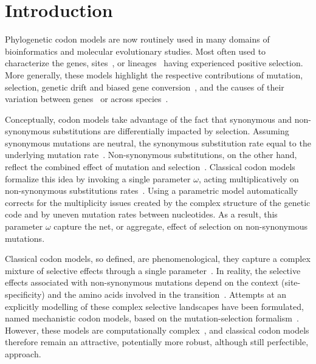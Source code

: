 \section{Introduction}

Phylogenetic codon models are now routinely used in many domains of bioinformatics and molecular evolutionary studies.
Most often used to characterize the genes, sites~\citep{Nielsen1998}, or lineages~\citep{Zhang2004} having experienced positive selection.
More generally, these models highlight the respective contributions of mutation, selection, genetic drift and biased gene conversion~\citep{Kosiol2019}, and the causes of their variation between genes~\citep{Zhang2015} or across species~\citep{Lartillot2011}.

Conceptually, codon models take advantage of the fact that synonymous and non-synonymous substitutions are differentially impacted by selection.
Assuming synonymous mutations are neutral, the synonymous substitution rate equal to the underlying mutation rate~\citep{kimura1983neutral}.
Non-synonymous substitutions, on the other hand, reflect the combined effect of mutation and selection~\citep{Ohta1995}.
Classical codon models formalize this idea by invoking a single parameter $\omega$, acting multiplicatively on non-synonymous substitutions rates~\citep{Muse1994, Goldman1994}.
Using a parametric model automatically corrects for the multiplicity issues created by the complex structure of the genetic code and by uneven mutation rates between nucleotides.
As a result, this parameter $\omega$ capture the net, or aggregate, effect of selection on non-synonymous mutations.

Classical codon models, so defined, are phenomenological, they capture a complex mixture of selective effects through a single parameter~\citep{Rodrigue2010a}.
In reality, the selective effects associated with non-synonymous mutations depend on the context (site-specificity) and the amino acids involved in the transition~\citep{Kosiol2007}.
Attempts at an explicitly modelling of these complex selective landscapes have been formulated, named mechanistic codon models, based on the mutation-selection formalism~\citep{Halpern1998}.
However, these models are computationally complex~\citep{Rodrigue2010, Tamuri2012}, and classical codon models therefore remain an attractive, potentially more robust, although still perfectible, approach.

